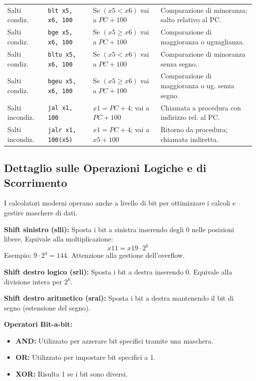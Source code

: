 \documentclass[12pt, a4paper]{article}
\begin{document}
\begin{table}[H]
{\begin{tabular}{l l l >{\raggedright\arraybackslash}p{6cm}}
Salti condiz. & \texttt{blt x5, x6, 100} & Se $(x5 < x6)$ vai a $PC+100$ & Comparazione di minoranza; salto relativo al PC. \\
Salti condiz. & \texttt{bge x5, x6, 100} & Se $(x5 \ge x6)$ vai a $PC+100$ & Comparazione di maggioranza o uguaglianza. \\
Salti condiz. & \texttt{bltu x5, x6, 100} & Se $(x5 < x6)$ vai a $PC+100$ & Comparazione di minoranza senza segno. \\
Salti condiz. & \texttt{bgeu x5, x6, 100} & Se $(x5 \ge x6)$ vai a $PC+100$ & Comparazione di maggioranza o ug. senza segno. \\
\addlinespace
Salti incondiz. & \texttt{jal x1, 100} & $x1 = PC+4$; vai a $PC+100$ & Chiamata a procedura con indirizzo rel. al PC. \\
Salti incondiz. & \texttt{jalr x1, 100(x5)} & $x1 = PC+4$; vai a $x5+100$ & Ritorno da procedura; chiamata indiretta. \\
\bottomrule
\end{tabular}%
}
\end{table}

\subsection{Dettaglio sulle Operazioni Logiche e di Scorrimento}
I calcolatori moderni operano anche a livello di bit per ottimizzare i calcoli e gestire maschere di dati.

\textbf{Shift sinistro (slli):}
Sposta i bit a sinistra inserendo degli 0 nelle posizioni libere. Equivale alla moltiplicazione:
\[
x11 = x19 \cdot 2^k
\]
Esempio: $9 \cdot 2^4 = 144$. Attenzione alla gestione dell'overflow.

\textbf{Shift destro logico (srli):}
Sposta i bit a destra inserendo 0. Equivale alla divisione intera per $2^k$.

\textbf{Shift destro aritmetico (srai):}
Sposta i bit a destra mantenendo il bit di segno (estensione del segno).

\textbf{Operatori Bit-a-bit:}
\begin{itemize}
\item \textbf{AND:} Utilizzato per azzerare bit specifici tramite una maschera.
\item \textbf{OR:} Utilizzato per impostare bit specifici a 1.
\item \textbf{XOR:} Risulta 1 se i bit sono diversi.
\end{itemize}
\end{document}
